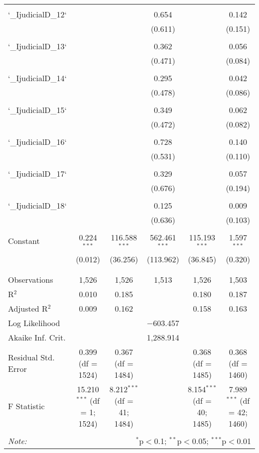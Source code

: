 \documentclass{article}
\begin{document}
\begin{table}[!htbp]
{\begin{tabular}{@{\extracolsep{5pt}}lccccc}
  & & & & & \\ 
 `\_IjudicialD\_12` &  &  & 0.654 &  & 0.142 \\ 
  &  &  & (0.611) &  & (0.151) \\ 
  & & & & & \\ 
 `\_IjudicialD\_13` &  &  & 0.362 &  & 0.056 \\ 
  &  &  & (0.471) &  & (0.084) \\ 
  & & & & & \\ 
 `\_IjudicialD\_14` &  &  & 0.295 &  & 0.042 \\ 
  &  &  & (0.478) &  & (0.086) \\ 
  & & & & & \\ 
 `\_IjudicialD\_15` &  &  & 0.349 &  & 0.062 \\ 
  &  &  & (0.472) &  & (0.082) \\ 
  & & & & & \\ 
 `\_IjudicialD\_16` &  &  & 0.728 &  & 0.140 \\ 
  &  &  & (0.531) &  & (0.110) \\ 
  & & & & & \\ 
 `\_IjudicialD\_17` &  &  & 0.329 &  & 0.057 \\ 
  &  &  & (0.676) &  & (0.194) \\ 
  & & & & & \\ 
 `\_IjudicialD\_18` &  &  & 0.125 &  & 0.009 \\ 
  &  &  & (0.636) &  & (0.103) \\ 
  & & & & & \\ 
 Constant & 0.224$^{***}$ & 116.588$^{***}$ & 562.461$^{***}$ & 115.193$^{***}$ & 1.597$^{***}$ \\ 
  & (0.012) & (36.256) & (113.962) & (36.845) & (0.320) \\ 
  & & & & & \\ 
\hline \\[-1.8ex] 
Observations & 1,526 & 1,526 & 1,513 & 1,526 & 1,503 \\ 
R$^{2}$ & 0.010 & 0.185 &  & 0.180 & 0.187 \\ 
Adjusted R$^{2}$ & 0.009 & 0.162 &  & 0.158 & 0.163 \\ 
Log Likelihood &  &  & $-$603.457 &  &  \\ 
Akaike Inf. Crit. &  &  & 1,288.914 &  &  \\ 
Residual Std. Error & 0.399 (df = 1524) & 0.367 (df = 1484) &  & 0.368 (df = 1485) & 0.368 (df = 1460) \\ 
F Statistic & 15.210$^{***}$ (df = 1; 1524) & 8.212$^{***}$ (df = 41; 1484) &  & 8.154$^{***}$ (df = 40; 1485) & 7.989$^{***}$ (df = 42; 1460) \\ 
\hline 
\hline \\[-1.8ex] 
\textit{Note:}  & \multicolumn{5}{r}{$^{*}$p$<$0.1; $^{**}$p$<$0.05; $^{***}$p$<$0.01} \\ 
\end{tabular} }
\end{table} 
\end{document}
